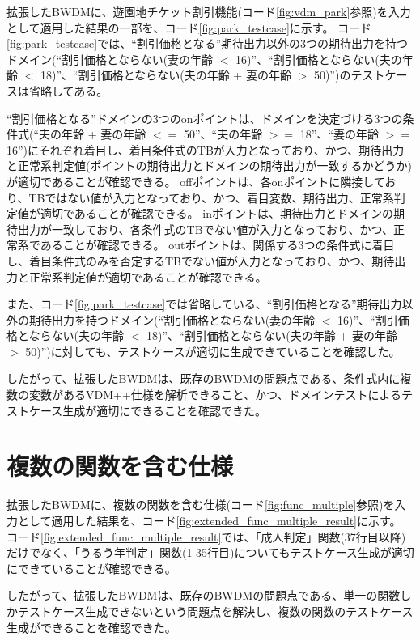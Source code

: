 \documentclass[uplatex, report, a4j, 10pt]{jsbook}
\begin{document}
拡張したBWDMに、遊園地チケット割引機能(コード\ref{fig:vdm_park}参照)を入力として適用した結果の一部を、コード\ref{fig:park_testcase}に示す。
コード\ref{fig:park_testcase}では、“割引価格となる”期待出力以外の3つの期待出力を持つドメイン(“割引価格とならない(妻の年齢 $<$ 16)”、“割引価格とならない(夫の年齢 $<$ 18)”、“割引価格とならない(夫の年齢 + 妻の年齢 $>$ 50)”)のテストケースは省略してある。

“割引価格となる”ドメインの3つのonポイントは、ドメインを決定づける3つの条件式(“夫の年齢 + 妻の年齢 $<=$ 50”、“夫の年齢 $>=$ 18”、“妻の年齢 $>=$ 16”)にそれぞれ着目し、着目条件式のTBが入力となっており、かつ、期待出力と正常系判定値(ポイントの期待出力とドメインの期待出力が一致するかどうか)が適切であることが確認できる。
offポイントは、各onポイントに隣接しており、TBではない値が入力となっており、かつ、着目変数、期待出力、正常系判定値が適切であることが確認できる。
inポイントは、期待出力とドメインの期待出力が一致しており、各条件式のTBでない値が入力となっており、かつ、正常系であることが確認できる。
outポイントは、関係する3つの条件式に着目し、着目条件式のみを否定するTBでない値が入力となっており、かつ、期待出力と正常系判定値が適切であることが確認できる。

また、コード\ref{fig:park_testcase}では省略している、“割引価格となる”期待出力以外の期待出力を持つドメイン(“割引価格とならない(妻の年齢 $<$ 16)”、“割引価格とならない(夫の年齢 $<$ 18)”、“割引価格とならない(夫の年齢 + 妻の年齢 $>$ 50)”)に対しても、テストケースが適切に生成できていることを確認した。

したがって、拡張したBWDMは、既存のBWDMの問題点である、条件式内に複数の変数があるVDM++仕様を解析できること、かつ、ドメインテストによるテストケース生成が適切にできることを確認できた。


\section{複数の関数を含む仕様}
拡張したBWDMに、複数の関数を含む仕様(コード\ref{fig:func_multiple}参照)を入力として適用した結果を、コード\ref{fig:extended_func_multiple_result}に示す。
コード\ref{fig:extended_func_multiple_result}では、「成人判定」関数(37行目以降)だけでなく、「うるう年判定」関数(1-35行目)についてもテストケース生成が適切にできていることが確認できる。

したがって、拡張したBWDMは、既存のBWDMの問題点である、単一の関数しかテストケース生成できないという問題点を解決し、複数の関数のテストケース生成ができることを確認できた。
\end{document}
